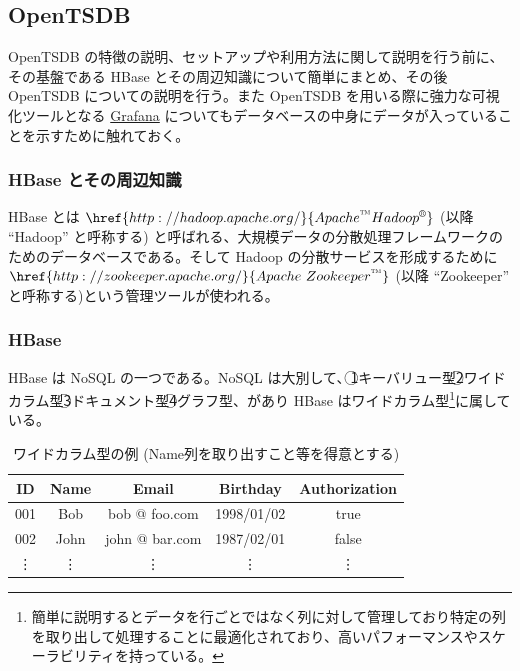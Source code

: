 \documentclass{scrartcl}
\begin{document}
\newpage
\subsection{OpenTSDB}
\label{sec:org8f452b1}
OpenTSDB の特徴の説明、セットアップや利用方法に関して説明を行う前に、その基盤である HBase とその周辺知識について簡単にまとめ、その後 OpenTSDB についての説明を行う。また OpenTSDB を用いる際に強力な可視化ツールとなる \href{https://grafana.com/}{Grafana} についてもデータベースの中身にデータが入っていることを示すために触れておく。\\

\subsubsection{HBase とその周辺知識}
\label{sec:org7829c62}
HBase とは \(\href{http://hadoop.apache.org/}{Apache \textsuperscript{\texttrademark} Hadoop \textsuperscript{\textregistered}}\) (以降 ``Hadoop'' と呼称する) と呼ばれる、大規模データの分散処理フレームワークのためのデータベースである。そして Hadoop の分散サービスを形成するために \(\href{http://zookeeper.apache.org/}{Apache \ Zookeeper \textsuperscript{\texttrademark}}\) (以降 ``Zookeeper'' と呼称する)という管理ツールが使われる。\\
\subsubsection{HBase}
\label{sec:org17f9cae}
HBase は NoSQL の一つである。NoSQL は大別して、\textcircled{\scriptsize 1}キーバリュー型\textcircled{\scriptsize 2}ワイドカラム型\textcircled{\scriptsize 3}ドキュメント型\textcircled{\scriptsize 4}グラフ型、があり HBase はワイドカラム型\footnote{簡単に説明するとデータを行ごとではなく列に対して管理しており特定の列を取り出して処理することに最適化されており、高いパフォーマンスやスケーラビリティを持っている。}に属している。\\

\begin{table}[htbp]
\caption{ワイドカラム型の例 (Name列を取り出すこと等を得意とする)}
\centering
\begin{tabular}{|c|c|c|c|c|}
\hline
ID & Name & Email & Birthday & Authorization\\
\hline
001 & Bob & bob @ foo.com & 1998/01/02 & true\\
002 & John & john @ bar.com & 1987/02/01 & false\\
\vdots & \vdots & \vdots & \vdots & \vdots\\
\hline
\end{tabular}
\end{table}
\end{document}
